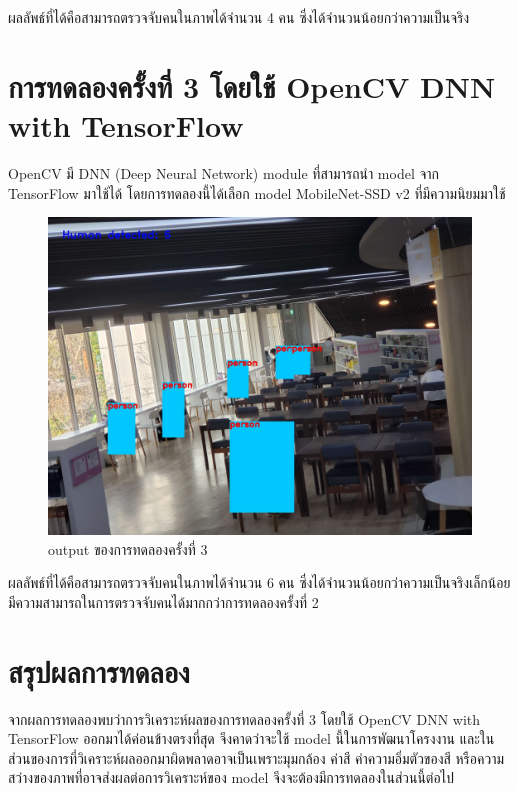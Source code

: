 ผลลัพธ์ที่ได้คือสามารถตรวจจับคนในภาพได้จำนวน 4 คน ซึ่งได้จำนวนน้อยกว่าความเป็นจริง

\section{การทดลองครั้งที่ 3 โดยใช้ OpenCV DNN with TensorFlow}
\hspace{10mm} OpenCV มี DNN (Deep Neural Network) module ที่สามารถนำ model จาก TensorFlow มาใช้ได้ โดยการทดลองนี้ได้เลือก model MobileNet-SSD v2 ที่มีความนิยมมาใช้

\begin{figure}[h]
    \centering
    \includegraphics[scale=0.25]{images/dnn_output.jpg}
    \caption[output]{output ของการทดลองครั้งที่ 3}
    \label{fig:output3}
\end{figure}

ผลลัพธ์ที่ได้คือสามารถตรวจจับคนในภาพได้จำนวน 6 คน ซึ่งได้จำนวนน้อยกว่าความเป็นจริงเล็กน้อย มีความสามารถในการตรวจจับคนได้มากกว่าการทดลองครั้งที่ 2

\section{สรุปผลการทดลอง}
\hspace{10mm} จากผลการทดลองพบว่าการวิเคราะห์ผลของการทดลองครั้งที่ 3 โดยใช้ OpenCV DNN with TensorFlow ออกมาได้ค่อนข้างตรงที่สุด จึงคาดว่าจะใช้ model นี้ในการพัฒนาโครงงาน
และในส่วนของการที่วิเคราะห์ผลออกมาผิดพลาดอาจเป็นเพราะมุมกล้อง ค่าสี ค่าความอิ่มตัวของสี หรือความสว่างของภาพที่อาจส่งผลต่อการวิเคราะห์ของ model จึงจะต้องมีการทดลองในส่วนนี้ต่อไป
